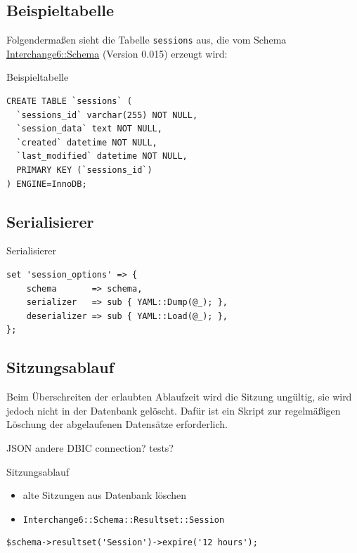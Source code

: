 \subsection{Beispieltabelle}

Folgendermaßen sieht die Tabelle \verb|sessions| aus,
die vom Schema \href{https://metacpan.org/pod/Interchange6::Schema}{Interchange6::Schema} (Version 0.015)
erzeugt wird:

\begin{frame}[fragile]{Beispieltabelle}
\begin{lstlisting}
CREATE TABLE `sessions` (
  `sessions_id` varchar(255) NOT NULL,
  `session_data` text NOT NULL,
  `created` datetime NOT NULL,
  `last_modified` datetime NOT NULL,
  PRIMARY KEY (`sessions_id`)
) ENGINE=InnoDB;
\end{lstlisting}
\end{frame}

\subsection{Serialisierer}
\begin{frame}[fragile]{Serialisierer}
\begin{lstlisting}
set 'session_options' => {
    schema       => schema,
    serializer   => sub { YAML::Dump(@_); },
    deserializer => sub { YAML::Load(@_); },
};
\end{lstlisting}
\end{frame}

\subsection{Sitzungsablauf}

Beim Überschreiten der erlaubten Ablaufzeit wird die Sitzung
ungültig, sie wird jedoch nicht in der Datenbank gelöscht.
Dafür ist ein Skript zur regelmäßigen Löschung der
abgelaufenen Datensätze erforderlich.

JSON
andere DBIC connection?
tests?

\begin{frame}[fragile]{Sitzungsablauf}
\begin{itemize}
\item alte Sitzungen aus Datenbank löschen
\item \verb|Interchange6::Schema::Resultset::Session|
\end{itemize}
\begin{lstlisting}
$schema->resultset('Session')->expire('12 hours');
\end{lstlisting}
\end{frame}

